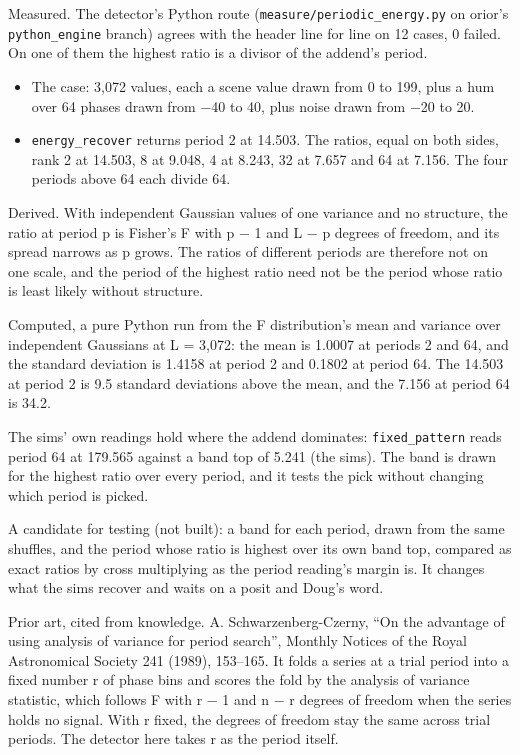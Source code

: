Measured. The detector's Python route (\texttt{measure/\allowbreak{}periodic\_\allowbreak{}energy.\allowbreak{}py} on orior's \texttt{python\_\allowbreak{}engine} branch) agrees with the header line for line on 12 cases, 0 failed. On one of them the highest ratio is a divisor of the addend's period.

\begin{itemize}
\item The case: 3,072 values, each a scene value drawn from 0 to 199, plus a hum over 64 phases drawn from −40 to 40, plus noise drawn from −20 to 20.
\item \texttt{energy\_\allowbreak{}recover} returns period 2 at 14.503. The ratios, equal on both sides, rank 2 at 14.503, 8 at 9.048, 4 at 8.243, 32 at 7.657 and 64 at 7.156. The four periods above 64 each divide 64.
\end{itemize}

Derived. With independent Gaussian values of one variance and no structure, the ratio at period p is Fisher's F with p − 1 and L − p degrees of freedom, and its spread narrows as p grows. The ratios of different periods are therefore not on one scale, and the period of the highest ratio need not be the period whose ratio is least likely without structure.

Computed, a pure Python run from the F distribution's mean and variance over independent Gaussians at L = 3,072: the mean is 1.0007 at periods 2 and 64, and the standard deviation is 1.4158 at period 2 and 0.1802 at period 64. The 14.503 at period 2 is 9.5 standard deviations above the mean, and the 7.156 at period 64 is 34.2.

The sims' own readings hold where the addend dominates: \texttt{fixed\_\allowbreak{}pattern} reads period 64 at 179.565 against a band top of 5.241 (the sims). The band is drawn for the highest ratio over every period, and it tests the pick without changing which period is picked.

A candidate for testing (not built): a band for each period, drawn from the same shuffles, and the period whose ratio is highest over its own band top, compared as exact ratios by cross multiplying as the period reading's margin is. It changes what the sims recover and waits on a posit and Doug's word.

Prior art, cited from knowledge. A. Schwarzenberg-Czerny, “On the advantage of using analysis of variance for period search”, Monthly Notices of the Royal Astronomical Society 241 (1989), 153–165. It folds a series at a trial period into a fixed number r of phase bins and scores the fold by the analysis of variance statistic, which follows F with r − 1 and n − r degrees of freedom when the series holds no signal. With r fixed, the degrees of freedom stay the same across trial periods. The detector here takes r as the period itself.
